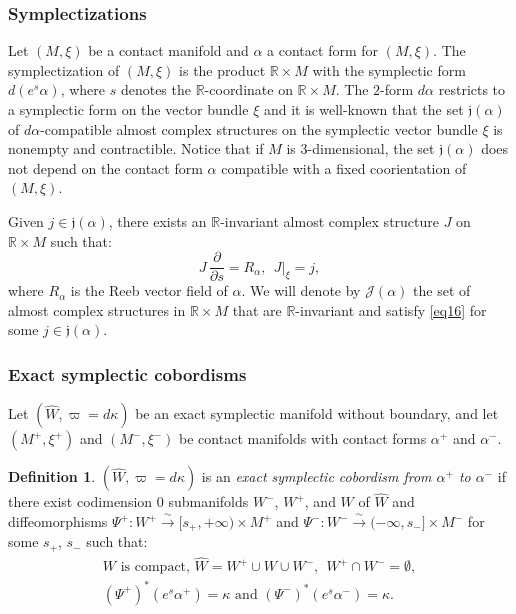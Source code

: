 \documentclass[JEP,XML,SOM,Unicode,NoFloatCountersInSection]{cedram}
\let\mathcal\mathscr
\newcommand{\isom}{\stackrel\sim\longrightarrow}
\theoremstyle{plain}
\theoremstyle{definition}
\newtheorem{defn}[thm]{Definition}
\numberwithin{equation}{subsection}
\newcommand{\bdry}{\partial}
\begin{document}

\subsubsection{Symplectizations}

Let $(M,\xi)$ be a contact manifold and $\alpha$ a contact form for $(M,\xi)$. The symplectization of $(M,\xi)$ is the product $\mathbb{R} \times M$ with the symplectic form $d(e^s \alpha)$, where $s$ denotes the $\mathbb{R}$-coordinate on $\mathbb{R} \times M$. The $2$-form $d\alpha$ restricts to a symplectic form on the vector bundle $\xi$ and it is well-known that the set $\mathfrak{j}(\alpha)$ of $d\alpha$\nobreakdash-compatible almost complex structures on the symplectic vector bundle $\xi$ is nonempty and contractible. Notice that if $M$ is $3$-dimensional, the set $\mathfrak{j}(\alpha)$ does not depend on the contact form $\alpha$ compatible with a fixed coorientation of $(M,\xi)$.

Given $j \in \mathfrak{j}(\alpha)$, there exists an $\mathbb{R}$-invariant almost complex structure $J$ on $\mathbb{R} \times M$ such that:
\begin{equation} \label{eq16}
J\, \frac{\bdry}{\bdry s} = R_\alpha, \ \ J|_\xi = j,
\end{equation}
where $R_\alpha$ is the Reeb vector field of $\alpha$.
We will denote by $\mathcal{J}(\alpha)$ the set of almost complex structures in $\mathbb{R} \times M$ that are $\mathbb{R}$-invariant
and satisfy \eqref{eq16} for some $j \in \mathfrak{j}(\alpha)$.

\subsubsection{Exact symplectic cobordisms}

Let $(\widehat{W} ,\varpi = d\kappa)$ be an exact symplectic manifold without boundary, and let $(M^+,\xi^+)$ and $(M^-,\xi^-)$ be contact manifolds with contact forms $\alpha^+$ and $\alpha^-$.

\begin{defn}
$(\widehat{W} ,\varpi = d\kappa)$ is an {\em exact symplectic cobordism from $\alpha^+$ to $\alpha^-$} if there exist codimension $0$ submanifolds $W^-$, $W^+$, and $W$ of $\widehat{W}$ and diffeomorphisms $\Psi^+: W^+ \isom [s_+,+\infty) \times M^+$ and $\Psi^-: W^- \isom (-\infty,s_-] \times M^-$ for some $s_+$, $s_-$ such that:
\begin{equation}
\begin{gathered}
W \mbox{ is compact, } \widehat{W}= W^+ \cup W \cup W^-, ~~ W^+ \cap W^- = \emptyset,\\
(\Psi^+)^* (e^s\alpha^+) = \kappa \mbox{ and } (\Psi^-)^* (e^s\alpha^-) = \kappa.
\end{gathered}
\end{equation}
\end{defn}
\end{document}
